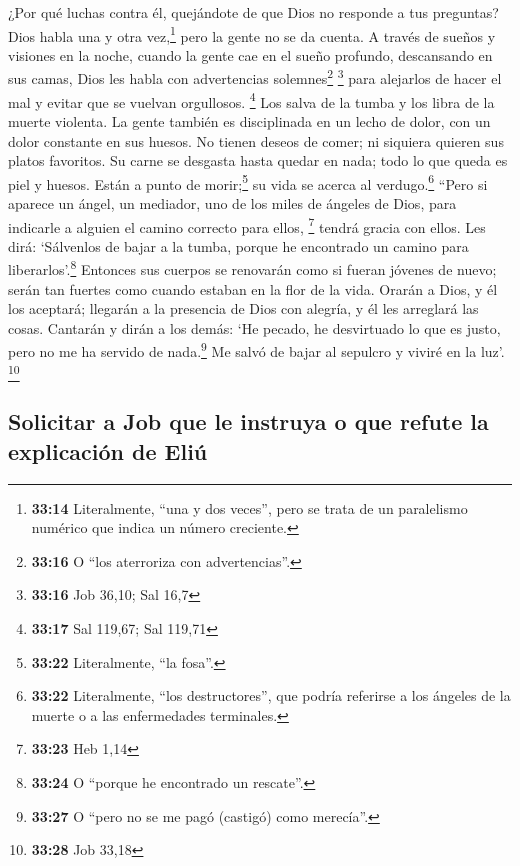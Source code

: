 ¿Por qué luchas contra él, quejándote de que Dios no
responde a tus preguntas?  Dios habla una y otra
vez,\footnote{\textbf{33:14} Literalmente, ``una y dos veces'', pero se
  trata de un paralelismo numérico que indica un número creciente.} pero
la gente no se da cuenta.  A través de sueños y visiones
en la noche, cuando la gente cae en el sueño profundo, descansando en
sus camas,  Dios les habla con advertencias
solemnes\footnote{\textbf{33:16} O ``los aterroriza con advertencias''.}
\footnote{\textbf{33:16} Job 36,10; Sal 16,7}  para
alejarlos de hacer el mal y evitar que se vuelvan orgullosos.
\footnote{\textbf{33:17} Sal 119,67; Sal 119,71}  Los
salva de la tumba y los libra de la muerte violenta.  La
gente también es disciplinada en un lecho de dolor, con un dolor
constante en sus huesos.  No tienen deseos de comer; ni
siquiera quieren sus platos favoritos.  Su carne se
desgasta hasta quedar en nada; todo lo que queda es piel y huesos.
 Están a punto de morir;\footnote{\textbf{33:22}
  Literalmente, ``la fosa''.} su vida se acerca al verdugo.\footnote{\textbf{33:22}
  Literalmente, ``los destructores'', que podría referirse a los ángeles
  de la muerte o a las enfermedades terminales.}  ``Pero
si aparece un ángel, un mediador, uno de los miles de ángeles de Dios,
para indicarle a alguien el camino correcto para ellos, \footnote{\textbf{33:23}
  Heb 1,14}  tendrá gracia con ellos. Les dirá:
`Sálvenlos de bajar a la tumba, porque he encontrado un camino para
liberarlos'.\footnote{\textbf{33:24} O ``porque he encontrado un
  rescate''.}  Entonces sus cuerpos se renovarán como si
fueran jóvenes de nuevo; serán tan fuertes como cuando estaban en la
flor de la vida.  Orarán a Dios, y él los aceptará;
llegarán a la presencia de Dios con alegría, y él les arreglará las
cosas.  Cantarán y dirán a los demás: `He pecado, he
desvirtuado lo que es justo, pero no me ha servido de nada.\footnote{\textbf{33:27}
  O ``pero no se me pagó (castigó) como merecía''.}  Me
salvó de bajar al sepulcro y viviré en la luz'. \footnote{\textbf{33:28}
  Job 33,18}

\hypertarget{solicitar-a-job-que-le-instruya-o-que-refute-la-explicaciuxf3n-de-eliuxfa}{%
\subsection{Solicitar a Job que le instruya o que refute la explicación
de
Eliú}\label{solicitar-a-job-que-le-instruya-o-que-refute-la-explicaciuxf3n-de-eliuxfa}}

